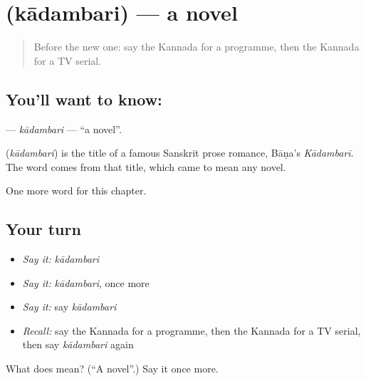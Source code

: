 \section[\texorpdfstring{\kn{ಕಾದಂಬರಿ} (kādambari)}{ಕಾದಂಬರಿ (kādambari)}]{ (kādambari) — a novel}

\label{lesson:KA-C300-kadambari}



\begin{quote}
Before the new one: say the Kannada for a programme, then the Kannada for a TV serial.
\end{quote}

\subsection*{You'll want to know: }
\textbf{} — \emph{kādambari} — \textquotedblleft{}a novel\textquotedblright{}.

\begin{cousinweb}
\textbf{} (\emph{kādambari}) is the title of a famous Sanskrit prose romance, Bāṇa's \emph{Kādambarī}. The word comes from that title, which came to mean any novel.
\end{cousinweb}

\begin{grammarlens}[title={What you've built}]
One more word for this chapter.
\end{grammarlens}

\subsection*{Your turn}
\begin{itemize}
\raggedright
  \item \emph{Say it:} \emph{kādambari}
  \item \emph{Say it:} \emph{kādambari}, once more
  \item \emph{Say it:} say \emph{kādambari}
  \item \emph{Recall:} say the Kannada for a programme, then the Kannada for a TV serial, then say \emph{kādambari} again
\end{itemize}

\begin{tcolorbox}[breakable,colback=teal!4,colframe=teal!35!black,title={Before you move on}]
What does  mean? (\textquotedblleft{}A novel\textquotedblright{}.) Say it once more.
\end{tcolorbox}
